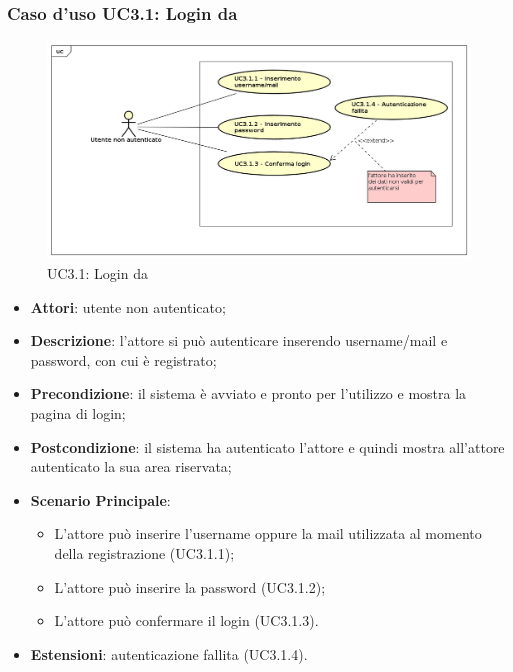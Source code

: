 \subsubsection{Caso d'uso UC3.1: Login da \progetto}
\label{UC3.1}
\begin{figure}
	\centering
	\includegraphics[scale=0.5]{UML/UC3_1.png}
	\caption{UC3.1: Login da \progetto}
\end{figure}
\FloatBarrier
\begin{itemize}
	\item \textbf{Attori}: utente non autenticato;
	\item \textbf{Descrizione}: l'attore si può autenticare inserendo username/mail e password, con cui è registrato;
	\item \textbf{Precondizione}: il sistema è avviato e pronto per l'utilizzo e mostra la pagina di login;
	\item \textbf{Postcondizione}: il sistema ha autenticato l'attore e quindi mostra all'attore autenticato la sua area riservata;
	\item \textbf{Scenario Principale}:
	\begin{itemize}
		\item L'attore può inserire l'username oppure la mail utilizzata al momento della registrazione (UC3.1.1);
		\item L'attore può inserire la password (UC3.1.2);
		\item L'attore può confermare il login (UC3.1.3).
	\end{itemize}
	\item \textbf{Estensioni}: autenticazione fallita (UC3.1.4).
\end{itemize}

